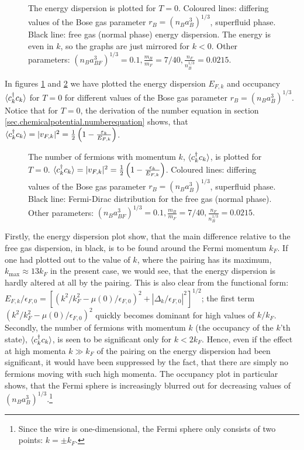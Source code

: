 \begin{figure} 
\begin{center}  
  
\caption{The energy dispersion is plotted for $T = 0$. Coloured lines: differing values of the Bose gas parameter $r_B = (n_Ba_B^3)^{1/3}$, superfluid phase. Black line: free gas (normal phase) energy dispersion. The energy is even in $k$, so the graphs are just mirrored for $k < 0$. Other parameters: $(n_Ba_{BF}^3)^{1/3} = 0.1, \frac{m_B}{m_F} = 7/40, \frac{n_F}{n_B^{1/3}} = 0.0215.$ }  
\label{fig.EnergyDispersion}  
\end{center}    
\end{figure}

In figures \ref{fig.EnergyDispersion} and \ref{fig.Occupancy} we have plotted the energy dispersion $E_{F,k}$ and occupancy $\braket{c_k^\dagger c_k}$ for $T = 0$ for different values of the Bose gas parameter $r_B = (n_Ba_B^3)^{1/3}$. Notice that for $T = 0$, the derivation of the number equation in section \ref{sec.chemicalpotential.numberequation} shows, that $\braket{c_k^\dagger c_k} = |v_{F,k}|^2 = \frac{1}{2}\left(1 -  \frac{\varepsilon_k}{E_{F,k}}\right)$. 

\begin{figure} 
\begin{center}  
  
\caption{The number of fermions with momentum $k$, $\braket{c_k^\dagger c_k}$, is plotted for $T = 0$. $\braket{c_k^\dagger c_k} = |v_{F,k}|^2 = \frac{1}{2}\left(1 - \frac{\epsilon_k}{E_{F,k}}\right)$. Coloured lines: differing values of the Bose gas parameter $r_B = (n_Ba_B^3)^{1/3}$, superfluid phase. Black line: Fermi-Dirac distribution for the free gas (normal phase). Other parameters: $(n_Ba_{BF}^3)^{1/3} = 0.1, \frac{m_B}{m_F} = 7/40, \frac{n_F}{n_B^{1/3}} = 0.0215.$  }  
\label{fig.Occupancy}  
\end{center}    
\end{figure}

Firstly, the energy dispersion plot show, that the main difference relative to the free gas dispersion, in black, is to be found around the Fermi momentum $k_F$. If one had plotted out to the value of $k$, where the pairing has its maximum, $k_{\max} \approx 13 k_F$ in the present case, we would see, that the energy dispersion is hardly altered at all by the pairing. This is also clear from the functional form: $E_{F,k}/\epsilon_{F,0} = [(k^2/k_F^2 - \mu(0)/\epsilon_{F,0})^2 + |\Delta_k/\epsilon_{F,0}|^2 ]^{1/2}$; the first term $(k^2/k_F^2 - \mu(0)/\epsilon_{F,0})^2$ quickly becomes dominant for high values of $k/k_F$. Secondly, the number of fermions with momentum $k$ (the occupancy of the $k$'th state), $\braket{c_k^\dagger c_k}$, is seen to be significant only for $k < 2k_F$. Hence, even if the effect at high momenta $k \gg k_F$ of the pairing on the energy dispersion had been significant, it would have been suppressed by the fact, that there are simply no fermions moving with such high momenta. The occupancy plot in particular shows, that the Fermi sphere is increasingly blurred out for decreasing values of $(n_Ba_B^3)^{1/3}$.\footnote{Since the wire is one-dimensional, the Fermi sphere only consists of two points: $k = \pm k_F$.} 

